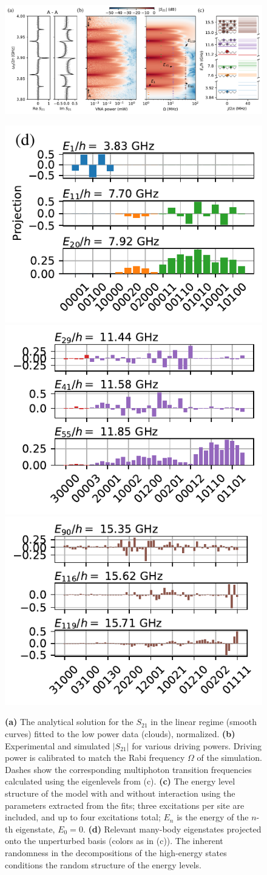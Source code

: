 \documentclass[%
 aps, prl,
 amsmath,amssymb,
 reprint,%
superscriptaddress
]{revtex4-2}
\begin{document}
\begin{figure}
	\centering
	\includegraphics[width=\linewidth]{fig3}
	
	
	\includegraphics[width=.33\linewidth]{eigenstates1}
	\includegraphics[width=.33\linewidth]{eigenstates2}
	\includegraphics[width=.33\linewidth]{eigenstates3}
	\caption{\textbf{(a)} The analytical solution for the $S_{21}$ in the linear regime (smooth curves) fitted to the low power data (clouds), normalized. \textbf{(b)} Experimental and simulated $|S_{21}|$ for various driving powers. Driving power is calibrated to match the Rabi frequency $\Omega$ of the simulation.  Dashes show the corresponding multiphoton transition frequencies calculated using the eigenlevels from (c). \textbf{(c)} The energy level structure of the model with and without interaction using the parameters extracted from the fits; three excitations per site are included, and up to four excitations total; $E_n$ is the energy of the $n$-th eigenstate, $E_0 = 0$. \textbf{(d)} Relevant many-body eigenstates projected onto the unperturbed basis (colors as in (c)). The inherent randomness in the decompositions of the high-energy states conditions the random structure of the energy levels.}
	\label{fig:cq_transition}
\end{figure}
\end{document}
